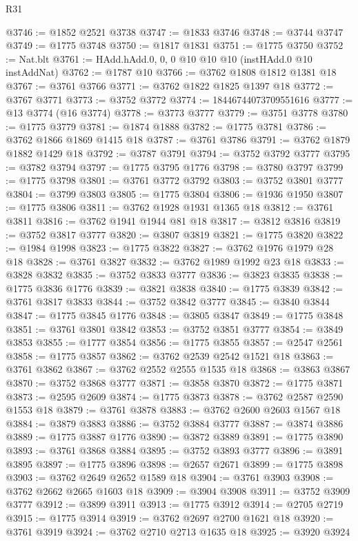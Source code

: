 \begin{lexlean}{R31}
\begin{coremodule}
@3746 := @1852 @2521 @3738
@3747 := @1833 @3746
@3748 := @3744 @3747
@3749 := @1775 @3748
@3750 := @1817 @1831
@3751 := @1775 @3750
@3752 := Nat.blt
@3761 := HAdd.hAdd.{0, 0, 0} @10 @10 @10 (instHAdd.{0} @10 instAddNat)
@3762 := @1787 @10
@3766 := @3762 @1808 @1812 @1381 @18
@3767 := @3761 @3766
@3771 := @3762 @1822 @1825 @1397 @18
@3772 := @3767 @3771
@3773 := @3752 @3772
@3774 := 18446744073709551616
@3777 := @13 @3774 (@16 @3774)
@3778 := @3773 @3777
@3779 := @3751 @3778
@3780 := @1775 @3779
@3781 := @1874 @1888
@3782 := @1775 @3781
@3786 := @3762 @1866 @1869 @1415 @18
@3787 := @3761 @3786
@3791 := @3762 @1879 @1882 @1429 @18
@3792 := @3787 @3791
@3794 := @3752 @3792 @3777
@3795 := @3782 @3794
@3797 := @1775 @3795 @1776
@3798 := @3780 @3797
@3799 := @1775 @3798
@3801 := @3761 @3772 @3792
@3803 := @3752 @3801 @3777
@3804 := @3799 @3803
@3805 := @1775 @3804
@3806 := @1936 @1950
@3807 := @1775 @3806
@3811 := @3762 @1928 @1931 @1365 @18
@3812 := @3761 @3811
@3816 := @3762 @1941 @1944 @81 @18
@3817 := @3812 @3816
@3819 := @3752 @3817 @3777
@3820 := @3807 @3819
@3821 := @1775 @3820
@3822 := @1984 @1998
@3823 := @1775 @3822
@3827 := @3762 @1976 @1979 @28 @18
@3828 := @3761 @3827
@3832 := @3762 @1989 @1992 @23 @18
@3833 := @3828 @3832
@3835 := @3752 @3833 @3777
@3836 := @3823 @3835
@3838 := @1775 @3836 @1776
@3839 := @3821 @3838
@3840 := @1775 @3839
@3842 := @3761 @3817 @3833
@3844 := @3752 @3842 @3777
@3845 := @3840 @3844
@3847 := @1775 @3845 @1776
@3848 := @3805 @3847
@3849 := @1775 @3848
@3851 := @3761 @3801 @3842
@3853 := @3752 @3851 @3777
@3854 := @3849 @3853
@3855 := @1777 @3854
@3856 := @1775 @3855
@3857 := @2547 @2561
@3858 := @1775 @3857
@3862 := @3762 @2539 @2542 @1521 @18
@3863 := @3761 @3862
@3867 := @3762 @2552 @2555 @1535 @18
@3868 := @3863 @3867
@3870 := @3752 @3868 @3777
@3871 := @3858 @3870
@3872 := @1775 @3871
@3873 := @2595 @2609
@3874 := @1775 @3873
@3878 := @3762 @2587 @2590 @1553 @18
@3879 := @3761 @3878
@3883 := @3762 @2600 @2603 @1567 @18
@3884 := @3879 @3883
@3886 := @3752 @3884 @3777
@3887 := @3874 @3886
@3889 := @1775 @3887 @1776
@3890 := @3872 @3889
@3891 := @1775 @3890
@3893 := @3761 @3868 @3884
@3895 := @3752 @3893 @3777
@3896 := @3891 @3895
@3897 := @1775 @3896
@3898 := @2657 @2671
@3899 := @1775 @3898
@3903 := @3762 @2649 @2652 @1589 @18
@3904 := @3761 @3903
@3908 := @3762 @2662 @2665 @1603 @18
@3909 := @3904 @3908
@3911 := @3752 @3909 @3777
@3912 := @3899 @3911
@3913 := @1775 @3912
@3914 := @2705 @2719
@3915 := @1775 @3914
@3919 := @3762 @2697 @2700 @1621 @18
@3920 := @3761 @3919
@3924 := @3762 @2710 @2713 @1635 @18
@3925 := @3920 @3924

\end{coremodule}
\end{lexlean}
